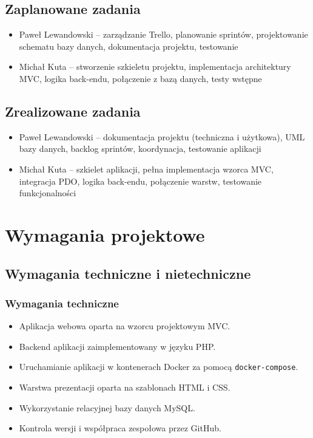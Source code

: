 \documentclass[12pt,a4paper]{article}
\begin{document}
\subsection{Zaplanowane zadania}
\begin{itemize}
    \item Paweł Lewandowski – zarządzanie Trello, planowanie sprintów, projektowanie schematu bazy danych, dokumentacja projektu, testowanie
    \item Michał Kuta – stworzenie szkieletu projektu, implementacja architektury MVC, logika back-endu, połączenie z bazą danych, testy wstępne
\end{itemize}

\subsection{Zrealizowane zadania}
\begin{itemize}
    \item Paweł Lewandowski – dokumentacja projektu (techniczna i użytkowa), UML bazy danych, backlog sprintów, koordynacja, testowanie aplikacji
    \item Michał Kuta – szkielet aplikacji, pełna implementacja wzorca MVC, integracja PDO, logika back-endu, połączenie warstw, testowanie funkcjonalności
\end{itemize}


\pagebreak
\section{Wymagania projektowe}
\subsection{Wymagania techniczne i nietechniczne}
\subsubsection*{Wymagania techniczne}
\begin{itemize}
    \item Aplikacja webowa oparta na wzorcu projektowym MVC.
    \item Backend aplikacji zaimplementowany w języku PHP.
    \item Uruchamianie aplikacji w kontenerach Docker za pomocą \texttt{docker-compose}.
    \item Warstwa prezentacji oparta na szablonach HTML i CSS.
    \item Wykorzystanie relacyjnej bazy danych MySQL.
    \item Kontrola wersji i współpraca zespołowa przez GitHub.
\end{itemize}
\end{document}
